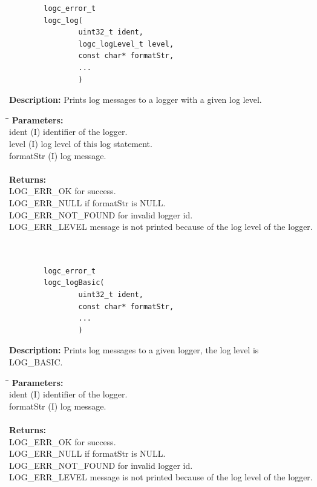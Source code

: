 \documentclass[a4paper, titlepage, 11pt]{article}
\begin{document}
\small
\begin{verbatim}
        logc_error_t
        logc_log(
                uint32_t ident,
                logc_logLevel_t level,
                const char* formatStr,
                ...
                )
\end{verbatim}
\normalsize
\textbf{Description:} Prints log messages to a logger with a given log level.
\begin{tabbing}
\hspace*{1cm}\=\hspace*{2cm}\=\hspace*{0,6cm}\= \kill
\textbf{Parameters:} \\
\> ident \> (I) identifier of the logger. \\
\> level \> (I) log level of this log statement. \\
\> formatStr \> (I) log message. \\ \\
\textbf{Returns:} \\
\> LOG\_ERR\_OK for success. \\
\> LOG\_ERR\_NULL if formatStr is NULL. \\
\> LOG\_ERR\_NOT\_FOUND for invalid logger id. \\
\> LOG\_ERR\_LEVEL message is not printed because of the log level of the logger. \\ \\ \\
\end{tabbing}

\small
\begin{verbatim}
        logc_error_t
        logc_logBasic(
                uint32_t ident,
                const char* formatStr,
                ...
                )
\end{verbatim}
\normalsize
\textbf{Description:} Prints log messages to a given logger, the log level is LOG\_BASIC.
\begin{tabbing}
\hspace*{1cm}\=\hspace*{2cm}\=\hspace*{0,6cm}\= \kill
\textbf{Parameters:} \\
\> ident \> (I) identifier of the logger. \\
\> formatStr \> (I) log message. \\ \\
\textbf{Returns:} \\
\> LOG\_ERR\_OK for success. \\
\> LOG\_ERR\_NULL if formatStr is NULL. \\
\> LOG\_ERR\_NOT\_FOUND for invalid logger id. \\
\> LOG\_ERR\_LEVEL message is not printed because of the log level of the logger. \\
\end{tabbing}
\end{document}
